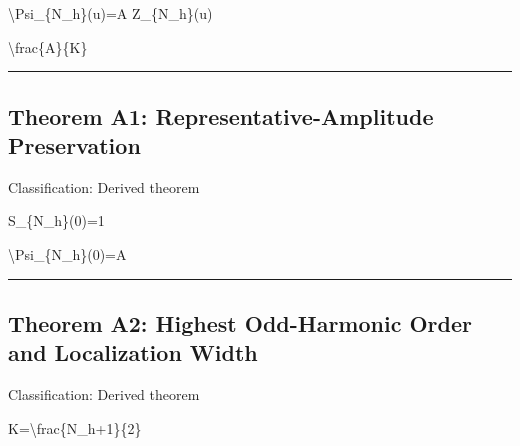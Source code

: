 \documentclass[
  a4paper,
]{article}
\newenvironment{Shaded}{}{}
\newcommand{\NormalTok}[1]{#1}
\begin{document}
\begin{Shaded}
\begin{Highlighting}[]
\NormalTok{\textbackslash{}Psi\_\{N\_h\}(u)=A Z\_\{N\_h\}(u)}
\end{Highlighting}
\end{Shaded}

\begin{Shaded}
\begin{Highlighting}[]
\NormalTok{\textbackslash{}frac\{A\}\{K\}}
\end{Highlighting}
\end{Shaded}

\begin{center}\rule{0.5\linewidth}{0.5pt}\end{center}

\subsection{Theorem A1: Representative-Amplitude
Preservation}\label{theorem-a1-representative-amplitude-preservation}

Classification: Derived theorem

\begin{Shaded}
\begin{Highlighting}[]
\NormalTok{S\_\{N\_h\}(0)=1}
\end{Highlighting}
\end{Shaded}

\begin{Shaded}
\begin{Highlighting}[]
\NormalTok{\textbackslash{}Psi\_\{N\_h\}(0)=A}
\end{Highlighting}
\end{Shaded}

\begin{center}\rule{0.5\linewidth}{0.5pt}\end{center}

\subsection{Theorem A2: Highest Odd-Harmonic Order and Localization
Width}\label{theorem-a2-highest-odd-harmonic-order-and-localization-width}

Classification: Derived theorem

\begin{Shaded}
\begin{Highlighting}[]
\NormalTok{K=\textbackslash{}frac\{N\_h+1\}\{2\}}
\end{Highlighting}
\end{Shaded}
\end{document}
